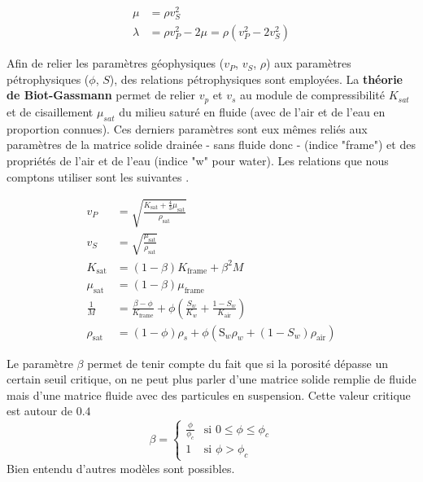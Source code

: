\begin{align*}
    \mu &= \rho v_S^2 \\
    \lambda &= \rho v_P^2 - 2\mu = \rho (v_P^2 - 2v_S^2)
\end{align*}

Afin de relier les paramètres géophysiques ($v_P$, $v_S$, $\rho$) aux paramètres pétrophysiques ($\phi$, $S$), des relations pétrophysiques sont employées. La \textbf{théorie de Biot-Gassmann} \cite{Biot1956,Gassmann1951} permet de relier $v_p$ et $v_s$ au module de compressibilité $K_{sat}$ et de cisaillement $\mu_{sat}$ du milieu saturé en fluide (avec de l'air et de l'eau en proportion connues). Ces derniers paramètres sont eux mêmes reliés aux paramètres de la matrice solide drainée - sans fluide donc - (indice "frame") et des propriétés de l'air et de l'eau (indice "w" pour water). Les relations que nous comptons utiliser sont les suivantes \cite{Abubakar_2012}.



\begin{align*}
v_P &= \sqrt{\frac{K_{\text{sat}} + \frac{4}{3}\mu_{\text{sat}}}{\rho_{\text{sat}}}} \\
v_S &= \sqrt{\frac{\mu_{\text{sat}}}{\rho_{\text{sat}}}} \\
K_{\text{sat}} &= (1 - \beta)K_{\text{frame}} + \beta^2 M \\
\mu_{\text{sat}} &= (1 - \beta)\mu_{\text{frame}} \\
\frac{1}{M} &= \frac{\beta - \phi}{K_{\text{frame}}} + \phi \left( \frac{S_w}{K_w} + \frac{1 - S_w}{K_{\text{air}}} \right) \\
\rho_{\text{sat}} &= (1 - \phi)\rho_s + \phi(\text{S}_w \rho_w + (1 - S_w)\rho_{\text{air}})
\end{align*}

Le paramètre $\beta$ permet de tenir compte du fait que si la porosité dépasse un certain seuil critique, on ne peut plus parler d'une matrice solide remplie de fluide mais d'une matrice fluide avec des particules en suspension. Cette valeur critique est autour de $0.4$ \cite{Nur1998}
\begin{equation}
    \beta =
\begin{cases}
    \frac{\phi}{\phi_c} & \text{si } 0 \leq \phi \leq \phi_c \\
    1 & \text{si } \phi > \phi_c
\end{cases}
\end{equation}
Bien entendu d'autres modèles sont possibles.\par 

